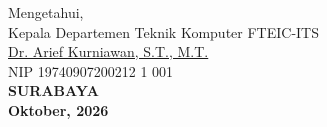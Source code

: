 \vspace{\fill}

\begin{center}
  Mengetahui,\\
  Kepala Departemen Teknik Komputer FTEIC-ITS\\
  \vspace{10ex}
  \underline{Dr. Arief Kurniawan, S.T., M.T. }\\
  NIP 19740907200212 1 001\\
  \vspace{10ex}
  \textbf{SURABAYA} \\
  \textbf{Oktober, 2026}
\end{center}
\endgroup

